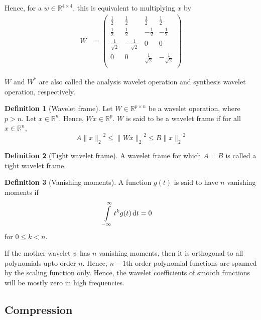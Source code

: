 \documentclass[titlepage, fleqn, a4paper, 12pt, twoside]{article}
\theoremstyle{definition}
\newtheorem{definition}{Definition}
\theoremstyle{theorem}
\begin{document}
Hence, for a $w \in \mathbb{R}^{4 \times 4}$, this is equivalent to multiplying $x$ by
\begin{align*}
	W &=
		\begin{pmatrix}
			\frac{1}{2} & \frac{1}{2} & \frac{1}{2} & \frac{1}{2}\\
			\frac{1}{2} & \frac{1}{2} & -\frac{1}{2} & -\frac{1}{2}\\
			\frac{1}{\sqrt{2}} & -\frac{1}{\sqrt{2}} & 0 & 0\\
			0 & 0 & \frac{1}{\sqrt{2}} & -\frac{1}{\sqrt{2}}\\
		\end{pmatrix}
\end{align*}

$W$ and $W^*$ are also called the analysis wavelet operation and synthesis wavelet operation, respectively.

\begin{definition}[Wavelet frame]
	Let $W \in \mathbb{R}^{p \times n}$ be a wavelet operation, where $p > n$.
	Let $x \in \mathbb{R}^n$.
	Hence, $W x \in \mathbb{R}^p$.
	$W$ is said to be a wavelet frame if for all $x \in \mathbb{R}^n$,
	\begin{equation*}
		A {\|x\|_2}^2 \le {\|W x\|_2}^2 \le B {\|x\|_2}^2
	\end{equation*}
\end{definition}

\begin{definition}[Tight wavelet frame]
	A wavelet frame for which $A = B$ is called a tight wavelet frame.
\end{definition}

\begin{definition}[Vanishing moments]
	A function $g(t)$ is said to have $n$ vanishing moments if
	\begin{align*}
		\int\limits_{-\infty}^{\infty} t^k g(t) \dif t &= 0
	\end{align*}
	for $0 \le k < n$.
\end{definition}

If the mother wavelet $\psi$ has $n$ vanishing moments, then it is orthogonal to all polynomials upto order $n$.
Hence, $n - 1$th order polynomial functions are spanned by the scaling function only.
Hence, the wavelet coefficients of smooth functions will be mostly zero in high frequencies.

\subsection{Compression}
\end{document}
